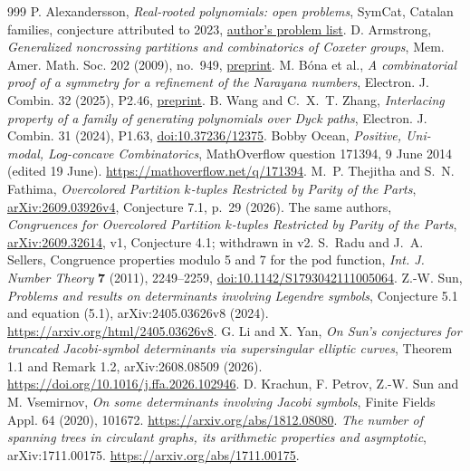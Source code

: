 \documentclass[11pt,a4paper]{article}
\begin{document}
\begin{thebibliography}{999}
P. Alexandersson, \emph{Real-rooted polynomials: open
problems}, SymCat, Catalan families, conjecture attributed to 2023,
\href{https://www.symmetricfunctions.com/realRootedOpenProblems.htm}{author's problem list}.
D. Armstrong, \emph{Generalized noncrossing partitions
and combinatorics of Coxeter groups}, Mem. Amer. Math. Soc. 202 (2009),
no.~949, \href{https://arxiv.org/abs/math/0611106}{preprint}.
M. B\'ona et al., \emph{A combinatorial proof of a symmetry
for a refinement of the Narayana numbers}, Electron. J. Combin. 32 (2025),
P2.46, \href{https://arxiv.org/abs/2212.10586}{preprint}.
B. Wang and C.~X.~T. Zhang, \emph{Interlacing property
of a family of generating polynomials over Dyck paths},
Electron. J. Combin. 31 (2024), P1.63,
\href{https://doi.org/10.37236/12375}{doi:10.37236/12375}.
Bobby Ocean, \emph{Positive, Uni-modal, Log-concave Combinatorics}, MathOverflow question 171394, 9 June 2014 (edited 19 June). \url{https://mathoverflow.net/q/171394}.
M.~P. Thejitha and S.~N. Fathima, \emph{Overcolored Partition $k$-tuples Restricted by Parity of the Parts}, \href{https://arxiv.org/pdf/2609.03926v4}{arXiv:2609.03926v4}, Conjecture 7.1, p.~29 (2026).
The same authors, \emph{Congruences for Overcolored Partition $k$-tuples Restricted by Parity of the Parts}, \href{https://arxiv.org/abs/2609.32614}{arXiv:2609.32614}, v1, Conjecture 4.1; withdrawn in v2.
S.~Radu and J.~A. Sellers, Congruence properties modulo 5 and 7 for the $\mathrm{pod}$ function, \emph{Int. J. Number Theory} \textbf{7} (2011), 2249--2259, \href{https://doi.org/10.1142/S1793042111005064}{doi:10.1142/S1793042111005064}.
Z.-W. Sun, \emph{Problems and results on determinants involving Legendre symbols}, Conjecture 5.1 and equation (5.1), arXiv:2405.03626v8 (2024). \url{https://arxiv.org/html/2405.03626v8}.
G. Li and X. Yan, \emph{On Sun's conjectures for truncated Jacobi-symbol determinants via supersingular elliptic curves}, Theorem 1.1 and Remark 1.2, arXiv:2608.08509 (2026). \url{https://doi.org/10.1016/j.ffa.2026.102946}.
D. Krachun, F. Petrov, Z.-W. Sun and M. Vsemirnov, \emph{On some determinants involving Jacobi symbols}, Finite Fields Appl. 64 (2020), 101672. \url{https://arxiv.org/abs/1812.08080}.
\emph{The number of spanning trees in circulant graphs, its arithmetic properties and asymptotic}, arXiv:1711.00175. \url{https://arxiv.org/abs/1711.00175}.

\end{thebibliography}
\end{document}
